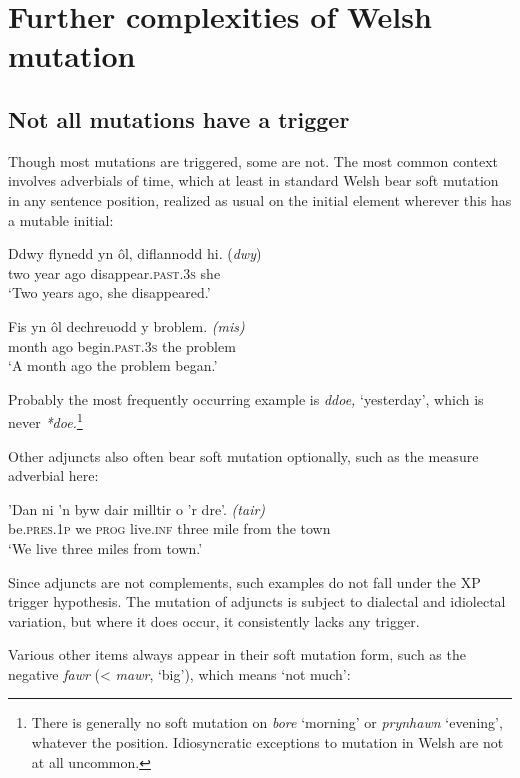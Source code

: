 \documentclass[output=paper,colorlinks,citecolor=brown]{langscibook}
\begin{document}
\section{Further complexities of Welsh mutation}\label{sec:tallerman:3}

\subsection{Not all mutations have a trigger}


Though most mutations are triggered, some are not. The most common context involves adverbials of time, which at least in standard Welsh bear soft mutation in any sentence position, realized as usual on the initial element wherever this has a mutable initial:

\ea\label{ex:mt:tallerman:22}
\gll Ddwy flynedd {yn ôl}, diflannodd hi.     (\textit{dwy})\\
two year ago disappear.\textsc{past.3s} she\\
\glt ‘Two years ago, she disappeared.’
\z

\ea\label{ex:mt:tallerman:23}
\gll Fis {yn ôl} dechreuodd y broblem. \textit{(mis)}\\
month ago begin.\textsc{past.3s} the problem\\
\glt ‘A month ago the problem began.’
\z

{Probably the most frequently occurring example is} {\textit{ddoe,} }{‘yesterday’, which is never} {\textit{*doe.}}\footnote{{There is generally no soft mutation on} {\textit{bore} }{‘morning’ or} {\textit{prynhawn} }{‘evening’, whatever the position. Idiosyncratic exceptions to mutation in Welsh are not at all uncommon.}}{ }

Other adjuncts also often bear soft mutation optionally, such as the measure adverbial here:

\ea\label{ex:mt:tallerman:24}
\gll ’Dan ni ’n byw dair milltir o ’r dre’. \textit{(tair)}\\
be.\textsc{pres.1p} we \textsc{prog} live.\textsc{inf} three mile from the town\\
\glt ‘We live three miles from town.’
\z

Since adjuncts are not complements, such examples do not fall under the XP trigger hypothesis. The mutation of adjuncts is subject to dialectal and idiolectal variation, but where it does occur, it consistently lacks any trigger. 

{Various other items always appear in their soft mutation form, such as the negative} {\textit{fawr} }{(<} {\textit{mawr}}{, ‘big’), which means ‘not much’:} 
\end{document}
